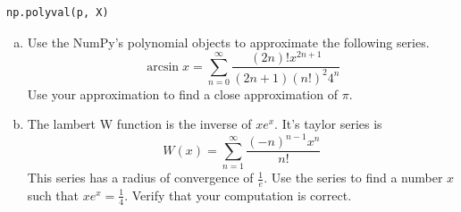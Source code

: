 \begin{lstlisting}
np.polyval(p, X)
\end{lstlisting}

\begin{problem}
\begin{enumerate}[a)]
\item Use the NumPy's polynomial objects to approximate the following series.
\[
\arcsin x = \sum_{n=0}^{\infty} \frac{\left(2 n\right) ! x^{2 n + 1}}{\left(2 n + 1\right)\left(n!\right)^2 4^n}
\]
Use your approximation to find a close approximation of $\pi$.

\item The lambert W function is the inverse of $x e^x$.
It's taylor series is
\[
W(x) = \sum_{n=1}^{\infty} \frac{\left(-n\right)^{n-1} x^n}{n!}
\]
This series has a radius of convergence of $\frac{1}{e}$.
Use the series to find a number $x$ such that $x e^x = \frac{1}{4}$.
Verify that your computation is correct.
\end{enumerate}
\end{problem}

